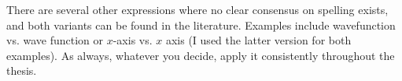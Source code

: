 There are several other expressions where no clear consensus on spelling exists, and both variants can be found in the literature. Examples include wavefunction vs. wave function or $x$-axis vs. $x$ axis (I used the latter version for both examples). As always, whatever you decide, apply it consistently throughout the thesis.
